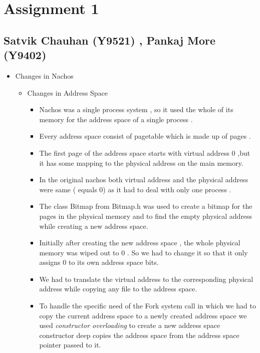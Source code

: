 \documentclass{article}
\begin{document}
\section{Assignment 1}

\subsection{Satvik Chauhan (Y9521) , Pankaj More (Y9402)}

\begin{itemize}
\item
  Changes in Nachos

  \begin{itemize}
  \item
    Changes in Address Space

    \begin{itemize}
    \item
      Nachos was a single process system , so it used the whole of its
      memory for the address space of a single process .
    \item
      Every address space consist of pagetable which is made up of pages
      .
    \item
      The first page of the address space starts with virtual address 0
      ,but it has some mapping to the physical address on the main
      memory.
    \item
      In the original nachos both virtual address and the physical
      address were same ( equals 0) as it had to deal with only one
      process .
    \item
      The class Bitmap from Bitmap.h was used to create a bitmap for the
      pages in the physical memory and to find the empty physical
      address while creating a new address space.
    \item
      Initially after creating the new address space , the whole
      physical memory was wiped out to 0 . So we had to change it so
      that it only assigns 0 to its own address space bits.
    \item
      We had to translate the virtual address to the corresponding
      physical address while copying any file to the address space.
    \item
      To handle the specific need of the Fork system call in which we
      had to copy the current address space to a newly created address
      space we used \emph{constructor overloading} to create a new
      address space constructor deep copies the address space from the
      address space pointer passed to it.

\end{itemize}
\end{itemize}
\end{itemize}
\end{document}
